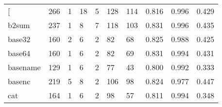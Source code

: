 \begin{longtable}{lp{1.3cm}p{1.3cm}p{1.3cm}p{1.3cm}p{1.3cm}p{1.3cm}p{1.3cm}p{1.3cm}p{1.3cm}}
\bottomrule
\endlastfoot
{[}         &                    266 &                                  1 &                                18 &                                5 &                               128 &                             114 &                                   0.816 &                                  0.996 &                                0.429 \\
b2sum     &                    237 &                                  1 &                                 8 &                                7 &                               118 &                             103 &                                   0.831 &                                  0.996 &                                0.435 \\
base32    &                    160 &                                  2 &                                 6 &                                2 &                                82 &                              68 &                                   0.825 &                                  0.988 &                                0.425 \\
base64    &                    160 &                                  1 &                                 6 &                                2 &                                82 &                              69 &                                   0.831 &                                  0.994 &                                0.431 \\
basename  &                    129 &                                  1 &                                 6 &                                2 &                                77 &                              43 &                                   0.800 &                                  0.992 &                                0.333 \\
basenc    &                    219 &                                  5 &                                 8 &                                2 &                               106 &                              98 &                                   0.824 &                                  0.977 &                                0.447 \\
cat       &                    164 &                                  1 &                                 6 &                                2 &                                98 &                              57 &                                   0.811 &                                  0.994 &                                0.348 \\

\end{longtable}
